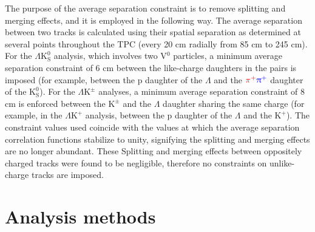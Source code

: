 \documentclass[ALICE,manyauthors]{cernphprep}
\newcommand{\Lam}{$\Lambda$\xspace}
\newcommand{\KchP}{$\mathrm{K^{+}}$\xspace}
\newcommand{\Kpm}{$\mathrm{K^{\pm}}$\xspace}
\newcommand{\Ks}{$\mathrm{K^{0}_{S}}$\xspace}
\newcommand{\LamKchP}{$\Lambda\mathrm{K^{+}}$\xspace}
\newcommand{\LamKpm}{$\Lambda\mathrm{K^{\pm}}$\xspace}
\newcommand{\LamKs}{$\Lambda\mathrm{K^{0}_{S}}$\xspace}
\newcommand{\Vz}{V$^{0}$\xspace}
\begin{document}
The purpose of the average separation constraint is to remove splitting and merging effects, and it is employed in the following way.  
The average separation between two tracks is calculated using their spatial separation as determined at several points throughout the TPC (every 20 cm radially from 85 cm to 245 cm).
For the \LamKs analysis, which involves two \Vz particles, a minimum average separation constraint of 6 cm between the like-charge daughters in the pairs is imposed (for example, between the p daughter of the \Lam and the ${\color{red}\pi^{+}}{\color{blue}\uppi^{+}}$ daughter of the \Ks).
For the \LamKpm analyses, a minimum average separation constraint of 8 cm is enforced between the \Kpm and the \Lam daughter sharing the same charge (for example, in the \LamKchP analysis, between the p daughter of the \Lam and the \KchP).
{\color{red}The constraint values used coincide with the values at which the average separation correlation functions stabilize to unity, signifying the splitting and merging effects are no longer abundant.}
{\color{red}These} {\color{blue}Splitting and merging} effects between oppositely charged tracks were found to be negligible, therefore no constraints on unlike-charge tracks are imposed.

\section{Analysis methods}
\label{sec:AnalysisMethods}

\end{document}
